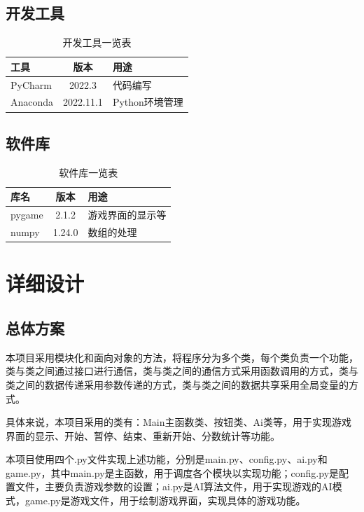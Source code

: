 \documentclass[UTF8,AutoFakeBold,AutoFakeSlant,zihao=-4]{ctexart}
\begin{document}
\subsection{开发工具}
\begin{table}[H]
  \centering
  \caption{开发工具一览表}
  \label{tab:dev-tool}
  \begin{tabular}{@{}lcl@{}}
    \toprule
    工具 & 版本 & 用途 \\ \midrule
    PyCharm & 2022.3 & 代码编写 \\ 
    Anaconda & 2022.11.1 & Python环境管理 \\ \bottomrule
  \end{tabular}
\end{table}



\subsection{软件库}
\begin{table}[H]
  \centering
  \caption{软件库一览表}
  \label{tab:soft-lib}
  \begin{tabular}{@{}lcl@{}}
    \toprule
    库名 & 版本 & 用途 \\ \midrule
    pygame & 2.1.2 & 游戏界面的显示等 \\ 
    numpy & 1.24.0 & 数组的处理 \\
    \bottomrule
  \end{tabular}
\end{table}



\clearpage

\section{详细设计}
\subsection{总体方案}
本项目采用模块化和面向对象的方法，将程序分为多个类，每个类负责一个功能，类与类之间通过接口进行通信，类与类之间的通信方式采用函数调用的方式，类与类之间的数据传递采用参数传递的方式，类与类之间的数据共享采用全局变量的方式。

具体来说，本项目采用的类有：Main主函数类、按钮类、Ai类等，用于实现游戏界面的显示、开始、暂停、结束、重新开始、分数统计等功能。

本项目使用四个.py文件实现上述功能，分别是main.py、config.py、ai.py和game.py，其中main.py是主函数，用于调度各个模块以实现功能；config.py是配置文件，主要负责游戏参数的设置；ai.py是AI算法文件，用于实现游戏的AI模式，game.py是游戏文件，用于绘制游戏界面，实现具体的游戏功能。
\end{document}
